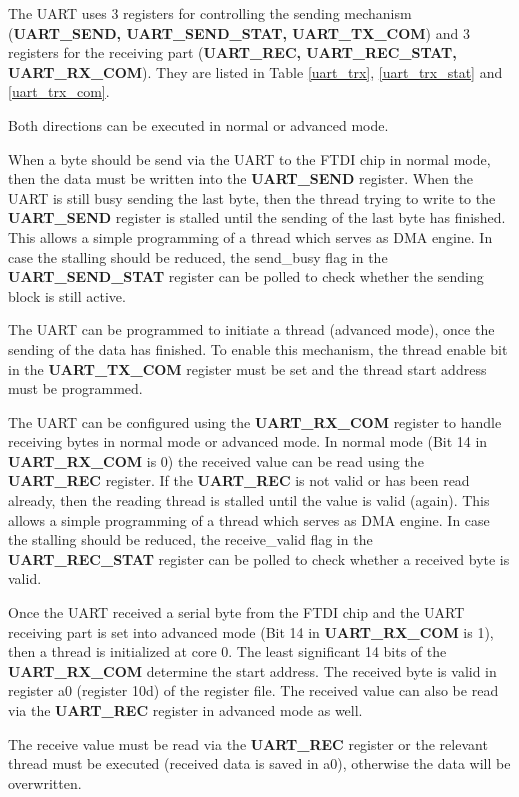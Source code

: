 The UART uses 3 registers for controlling the sending mechanism (\textbf{UART\_SEND, UART\_SEND\_STAT, UART\_TX\_COM}) and 3 registers for the receiving part (\textbf{UART\_REC, UART\_REC\_STAT, UART\_RX\_COM}). They are listed in Table \ref{uart_trx}, \ref{uart_trx_stat} and \ref{uart_trx_com}.

Both directions can be executed in normal or advanced mode.

When a byte should be send via the UART to the FTDI chip in normal mode, then the data must be written into the \textbf{UART\_SEND} register. When the UART is still busy sending the last byte, then the thread trying to write to the \textbf{UART\_SEND} register is stalled until the sending of the last byte has finished. This allows a simple programming of a thread which serves as DMA engine. In case the stalling should be reduced, the send\_busy flag in the \textbf{UART\_SEND\_STAT} register can be polled to check whether the sending block is still active.

The UART can be programmed to initiate a thread (advanced mode), once the sending of the data has finished. To enable this mechanism, the thread enable bit in the \textbf{UART\_TX\_COM} register must be set and the thread start address must be programmed. 

The UART can be configured using the \textbf{UART\_RX\_COM} register to handle receiving bytes in normal mode or advanced mode. In normal mode (Bit 14 in \textbf{UART\_RX\_COM} is 0) the received value can be read using the \textbf{UART\_REC} register. If the \textbf{UART\_REC} is not valid or has been read already, then the reading thread is stalled until the value is valid (again). This allows a simple programming of a thread which serves as DMA engine. In case the stalling should be reduced, the receive\_valid flag in the \textbf{UART\_REC\_STAT} register can be polled to check whether a received byte is valid.

Once the UART received a serial byte from the FTDI chip and the UART receiving part is set into advanced mode (Bit 14 in \textbf{UART\_RX\_COM} is 1), then a thread is initialized at core 0. The least significant 14 bits of the \textbf{UART\_RX\_COM} determine the start address. The received byte is valid in register a0 (register 10d) of the register file. The received value can also be read via the \textbf{UART\_REC} register in advanced mode as well.

The receive value must be read via the \textbf{UART\_REC} register or the relevant thread must be executed (received data is saved in a0), otherwise the data will be overwritten.

